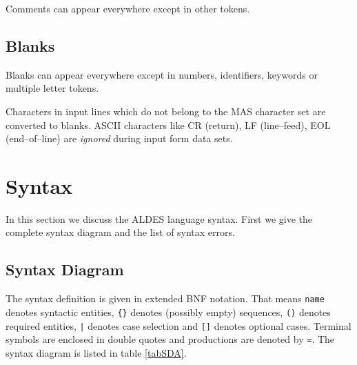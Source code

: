 Comments can appear everywhere except in other tokens.


\subsection{Blanks}

Blanks can appear everywhere except in 
numbers, identifiers, keywords or multiple letter tokens. 

Characters in input lines which do not belong to 
the MAS character set are converted to blanks.
ASCII characters like CR (return), LF (line--feed),
EOL (end--of--line) are {\em ignored} during input form
data sets. 


\section{Syntax}

In this section we discuss the ALDES language syntax. 
First we give the complete syntax diagram and the 
list of syntax errors. 


\subsection{Syntax Diagram}

The syntax definition is given in extended BNF
notation. That means
\verb/name/ denotes syntactic entities,
\verb/{}/ denotes (possibly empty) sequences,
\verb/()/ denotes required entities,
\verb/|/ denotes case selection and
\verb/[]/ denotes optional cases. 
Terminal symbols are enclosed in double quotes
and productions are denoted by \verb/=/. 
The syntax diagram is listed in table \ref{tabSDA}.

